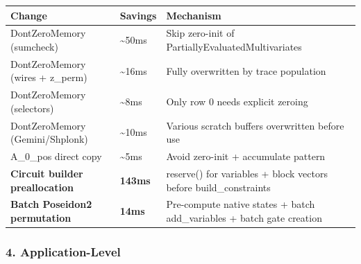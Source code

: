\documentclass[
]{article}
\newcounter{none} %
\begin{document}
{\def\LTcaptype{none} %
\begin{longtable}[]{@{}
  >{\raggedright\arraybackslash}p{}
  >{\raggedleft\arraybackslash}p{}
  >{\raggedright\arraybackslash}p{}@{}}
\toprule\noalign{}
\begin{minipage}[b]{\linewidth}\raggedright
Change
\end{minipage} & \begin{minipage}[b]{\linewidth}\raggedleft
Savings
\end{minipage} & \begin{minipage}[b]{\linewidth}\raggedright
Mechanism
\end{minipage} \\
\midrule\noalign{}
\endhead
\bottomrule\noalign{}
\endlastfoot
DontZeroMemory (sumcheck) & \textasciitilde50ms & Skip zero-init of
PartiallyEvaluatedMultivariates \\
DontZeroMemory (wires + z\_perm) & \textasciitilde16ms & Fully
overwritten by trace population \\
DontZeroMemory (selectors) & \textasciitilde8ms & Only row 0 needs
explicit zeroing \\
DontZeroMemory (Gemini/Shplonk) & \textasciitilde10ms & Various scratch
buffers overwritten before use \\
A\_0\_pos direct copy & \textasciitilde5ms & Avoid zero-init +
accumulate pattern \\
\textbf{Circuit builder preallocation} & \textbf{143ms} & reserve() for
variables + block vectors before build\_constraints \\
\textbf{Batch Poseidon2 permutation} & \textbf{14ms} & Pre-compute
native states + batch add\_variables + batch gate creation \\
\end{longtable}
}

\subsubsection{4. Application-Level}\label{application-level}
\end{document}

